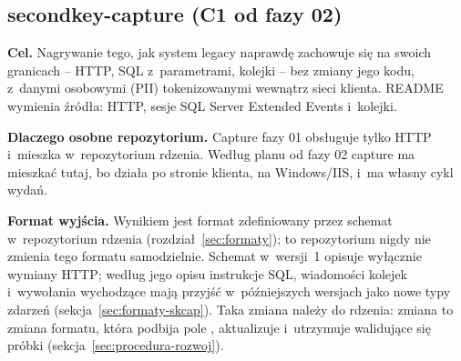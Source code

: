 
\subsection{secondkey-capture (C1 od fazy 02)}\label{sec:faza02-capture}

\textbf{Cel.} Nagrywanie tego, jak system legacy naprawdę zachowuje się na swoich granicach --
HTTP, SQL z~parametrami, kolejki -- bez zmiany jego kodu, z~danymi osobowymi (PII)
tokenizowanymi wewnątrz sieci klienta. README wymienia źródła: HTTP, sesje SQL Server
Extended Events i~kolejki.

\textbf{Dlaczego osobne repozytorium.} Capture fazy 01 obsługuje tylko HTTP i~mieszka
w~repozytorium rdzenia. Według planu od fazy 02 capture ma mieszkać tutaj, bo działa po
stronie klienta, na Windows/IIS, i~ma własny cykl wydań.

\textbf{Format wyjścia.} Wynikiem jest format  zdefiniowany przez schemat
w~repozytorium rdzenia (rozdział~\ref{sec:formaty}); to repozytorium nigdy nie zmienia tego
formatu samodzielnie. Schemat w~wersji~1 opisuje wyłącznie wymiany HTTP; według jego opisu
instrukcje SQL, wiadomości kolejek i~wywołania wychodzące mają przyjść w~późniejszych
wersjach jako nowe typy zdarzeń (sekcja~\ref{sec:formaty-skcap}). Taka zmiana należy do
rdzenia: zmiana  to zmiana formatu, która podbija pole ,
aktualizuje  i~utrzymuje walidujące się próbki
(sekcja~\ref{sec:procedura-rozwoj}).

